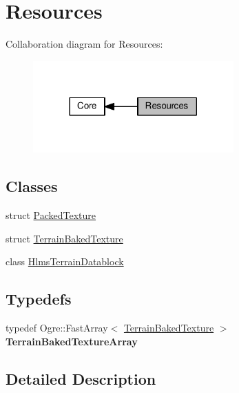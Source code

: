 \hypertarget{group___resources}{}\section{Resources}
\label{group___resources}
Collaboration diagram for Resources\+:\nopagebreak
\begin{figure}[H]
\begin{center}
\leavevmode
\includegraphics[width=218pt]{group___resources}
\end{center}
\end{figure}
\subsection*{Classes}
\begin{DoxyCompactItemize}
\item 
struct \hyperlink{struct_packed_texture}{Packed\+Texture}
\item 
struct \hyperlink{struct_terrain_baked_texture}{Terrain\+Baked\+Texture}
\item 
class \hyperlink{class_hlms_terrain_datablock}{Hlms\+Terrain\+Datablock}
\end{DoxyCompactItemize}
\subsection*{Typedefs}
\begin{DoxyCompactItemize}
\item 
\mbox{\label{group___resources_ga3acc3af61a63f13c587deeb475f10b2e}} 
typedef Ogre\+::\+Fast\+Array$<$ \hyperlink{struct_terrain_baked_texture}{Terrain\+Baked\+Texture} $>$ {\bfseries Terrain\+Baked\+Texture\+Array}
\end{DoxyCompactItemize}


\subsection{Detailed Description}
